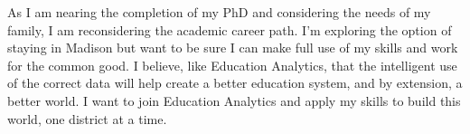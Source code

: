\documentclass[11pt, sans]{moderncv}
\begin{document}
As I am nearing the completion of my PhD and considering the needs of
my family, I am reconsidering the academic career path.  I'm exploring
the option of staying in Madison but want to be sure I can make full
use of my skills and work for the common good.  I believe, like
Education Analytics, that the intelligent use of the correct data will
help create a better education system, and by extension, a better
world.  I want to join Education Analytics and apply my skills to
build this world, one district at a time.

\makeletterclosing
\end{document}
